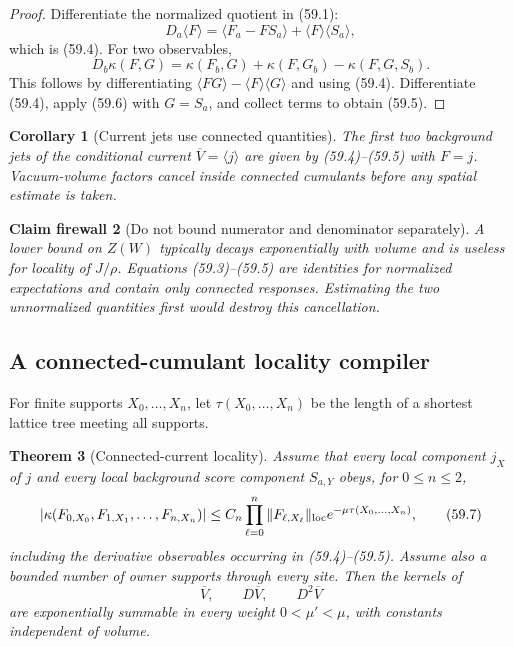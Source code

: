 \documentclass[11pt,oneside]{book}
\newtheorem{theorem}{Theorem}[chapter]
\newtheorem{corollary}[theorem]{Corollary}
\newtheorem{firewall}[theorem]{Claim firewall}
\theoremstyle{definition}
\theoremstyle{remark}
\begin{document}
\begin{proof}
Differentiate the normalized quotient in (59.1):
\[
 D_a\langle F\rangle
 =\langle F_a-FS_a\rangle+\langle F\rangle\langle S_a\rangle,
\]
which is (59.4).  For two observables,
\[
 D_b\kappa(F,G)
 =\kappa(F_b,G)+\kappa(F,G_b)-\kappa(F,G,S_b).                \tag{59.6}
\]
This follows by differentiating
\(\langle FG\rangle-\langle F\rangle\langle G\rangle\) and using
(59.4).  Differentiate (59.4), apply (59.6) with \(G=S_a\), and
collect terms to obtain (59.5).
\end{proof}

\begin{corollary}[Current jets use connected quantities]
\label{cor:e8v59-current-jets}
The first two background jets of the conditional current
\(\overline V=\langle j\rangle\) are given by (59.4)--(59.5) with
\(F=j\).  Vacuum-volume factors cancel inside connected cumulants
before any spatial estimate is taken.
\end{corollary}

\begin{firewall}[Do not bound numerator and denominator
separately]
\label{fire:e8v59-no-ratio-bound}
A lower bound on \(Z(W)\) typically decays exponentially with
volume and is useless for locality of \(J/\rho\).  Equations
(59.3)--(59.5) are identities for normalized expectations and
contain only connected responses.  Estimating the two
unnormalized quantities first would destroy this cancellation.
\end{firewall}

\subsection{A connected-cumulant locality compiler}

For finite supports \(X_0,\ldots,X_n\), let
\(\tau(X_0,\ldots,X_n)\) be the length of a shortest lattice tree
meeting all supports.

\begin{theorem}[Connected-current locality]
\label{thm:e8v59-current-locality}
Assume that every local component \(j_X\) of \(j\) and every local
background score component \(S_{a,Y}\) obeys, for \(0\le n\le2\),
\[
 \left|
 \kappa(F_{0,X_0},F_{1,X_1},\ldots,F_{n,X_n})
 \right|
 \le C_n\prod_{\ell=0}^n\|F_{\ell,X_\ell}\|_{\rm loc}
 e^{-\mu\tau(X_0,\ldots,X_n)},                               \tag{59.7}
\]
including the derivative observables occurring in (59.4)--(59.5).
Assume also a bounded number of owner supports through every site.
Then the kernels of
\[
 \overline V,\qquad D\overline V,\qquad D^2\overline V        \tag{59.8}
\]
are exponentially summable in every weight
\(0<\mu'<\mu\), with constants independent of volume.
\end{theorem}
\end{document}
